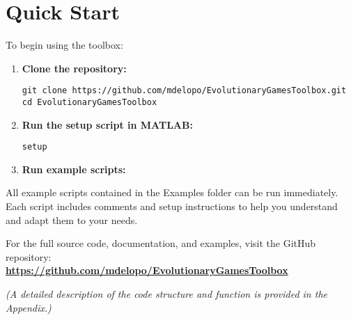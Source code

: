 \section{Quick Start}
To begin using the toolbox:
\begin{enumerate}
	\item \textbf{Clone the repository:}
	\begin{verbatim}
git clone https://github.com/mdelopo/EvolutionaryGamesToolbox.git
cd EvolutionaryGamesToolbox
	\end{verbatim}
	\item \textbf{Run the setup script in MATLAB:}
	\begin{verbatim}
setup
	\end{verbatim}
	\item \textbf{Run example scripts:}
\end{enumerate}

All example scripts contained in the Examples folder can be run immediately. Each script includes comments and setup instructions to help you understand and adapt them to your needs.

\medskip
\noindent
For the full source code, documentation, and examples, visit the GitHub repository: \\
\textbf{\url{https://github.com/mdelopo/EvolutionaryGamesToolbox}}

\medskip
\noindent
\textit{(A detailed description of the code structure and function is provided in the Appendix.)}